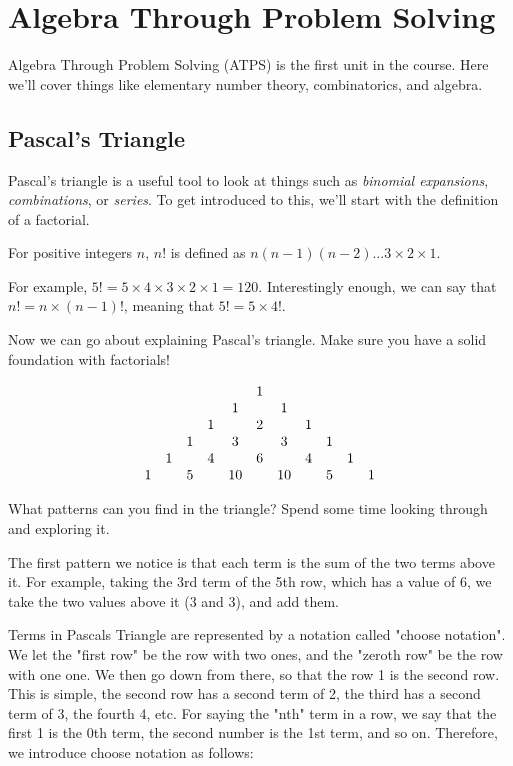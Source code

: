 \documentclass[11pt]{article}
\begin{document}
\section{Algebra Through Problem Solving}
Algebra Through Problem Solving (ATPS) is the first unit in the course. Here we'll cover things like elementary number theory, combinatorics, and algebra.

\subsection{Pascal's Triangle}

Pascal's triangle is a useful tool to look at things such as \textit{binomial expansions}, \textit{combinations}, or \textit{series}. To get introduced to this, we'll start with the definition of a factorial.
\begin{defn}
	For positive integers $n$, $n!$ is defined as $n(n-1)(n-2)\dots3\times2\times1$.
\end{defn}
For example, $5! = 5 \times 4 \times 3 \times 2 \times 1 = 120$. Interestingly enough, we can say that $n! = n \times (n-1)!$, meaning that $5! = 5\times 4!$.

Now we can go about explaining Pascal's triangle. Make sure you have a solid foundation with factorials!

\[\begin{array}{ccccccccccc}
  &    &    &    &    &  1 &    &    &    &    &   \cr
  &    &    &    &  1 &    &  1 &    &    &    &   \cr
  &    &    &  1 &    &  2 &    &  1 &    &    &   \cr
  &    &  1 &    &  3 &    &  3 &    &  1 &    &   \cr
  &  1 &    &  4 &    &  6 &    &  4 &    &  1 &   \cr
1 &    &  5 &    & 10 &    & 10 &    &  5 &    & 1 \cr
\end{array}\]

\begin{question}
    What patterns can you find in the triangle? Spend some time looking through and exploring it.
\end{question}
The first pattern we notice is that each term is the sum of the two terms above it. For example, taking the 3rd term of the 5th row, which has a value of 6, we take the two values above it (3 and 3), and add them.

Terms in Pascals Triangle are represented by a notation called "choose notation". We let the "first row" be the row with two ones, and the "zeroth row" be the row with one one. We then go down from there, so that the row 1 is the second row. This is simple, the second row has a second term of 2, the third has a second term of 3, the fourth 4, etc. For saying the "nth" term in a row, we say that the first 1 is the 0th term, the second number is the 1st term, and so on. Therefore, we introduce choose notation as follows:
\end{document}

